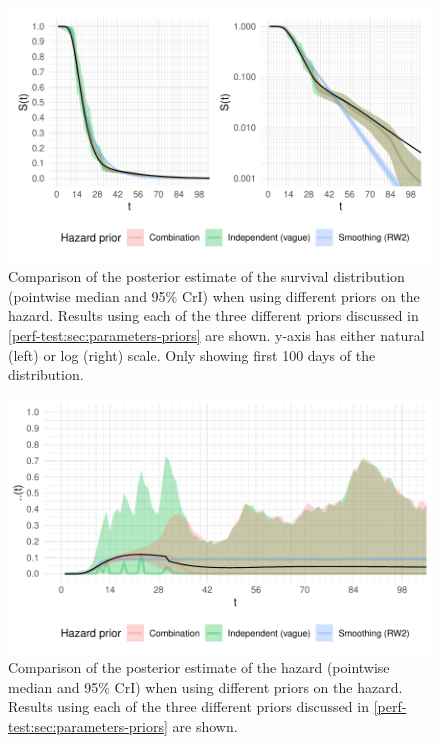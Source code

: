 \documentclass[thesis.tex]{subfiles}
\begin{document}
\begin{figure}
  \centering \includegraphics{cis-perfect-testing/survival-results}
  \caption[Comparison of survival function estimates under different priors]{Comparison of the posterior estimate of the survival distribution (pointwise median and 95\% CrI) when using different priors on the hazard. Results using each of the three different priors discussed in \cref{perf-test:sec:parameters-priors} are shown. y-axis has either natural (left) or log (right) scale. Only showing first 100 days of the distribution. \label{perf-test:fig:survival-results}}
\end{figure}

\begin{figure}
  \centering \includegraphics{cis-perfect-testing/hazard-results}
  \caption[Comparison of hazard estimates under different priors]{Comparison of the posterior estimate of the hazard (pointwise median and 95\% CrI) when using different priors on the hazard. Results using each of the three different priors discussed in \cref{perf-test:sec:parameters-priors} are shown. \label{perf-test:fig:hazard-results}}
\end{figure}
\end{document}
